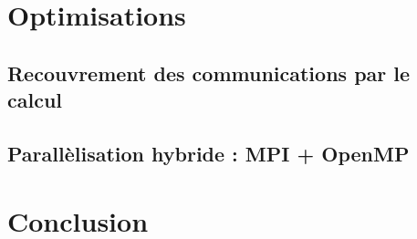 \documentclass[a4paper]{article}
\begin{document}
\section{Optimisations}

\subsection{Recouvrement des communications par le calcul}

\subsection{Parallèlisation hybride : MPI + OpenMP}

\section{Conclusion}
\end{document}
